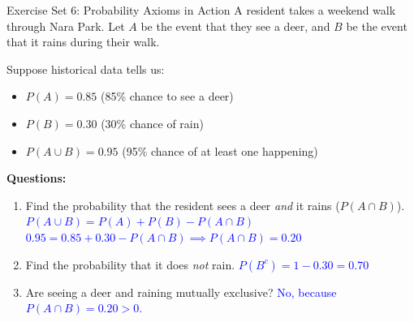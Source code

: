 \documentclass[aspectratio=169]{beamer}
\begin{document}
\begin{frame}{Exercise Set 6: Probability Axioms in Action}
    A resident takes a weekend walk through Nara Park. Let $A$ be the event that they see a deer, and $B$ be the event that it rains during their walk. 
    \vspace{0.2cm}
    
    Suppose historical data tells us:
    \begin{itemize}
        \item $P(A) = 0.85$ (85\% chance to see a deer)
        \item $P(B) = 0.30$ (30\% chance of rain)
        \item $P(A \cup B) = 0.95$ (95\% chance of at least one happening)
    \end{itemize}
    \vspace{0.2cm}
    
    \textbf{Questions:}
    \begin{enumerate}
        \item Find the probability that the resident sees a deer \emph{and} it rains ($P(A \cap B)$). \pause
        \newline \textcolor{blue}{$P(A \cup B) = P(A) + P(B) - P(A \cap B)$}
        \newline \textcolor{blue}{$0.95 = 0.85 + 0.30 - P(A \cap B) \implies P(A \cap B) = 0.20$} \pause
        \item Find the probability that it does \emph{not} rain. \pause \hfill \textcolor{blue}{$P(B^c) = 1 - 0.30 = 0.70$} \pause
        \item Are seeing a deer and raining mutually exclusive? \pause \hfill \textcolor{blue}{No, because $P(A \cap B) = 0.20 > 0$.}
    \end{enumerate}
\end{frame}
\end{document}
